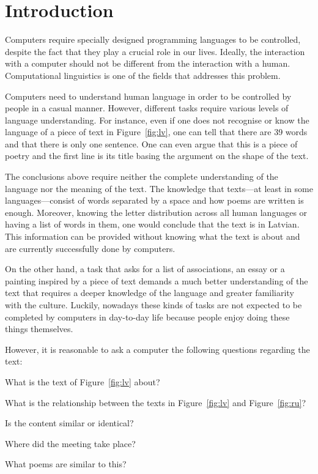 \chapter{Introduction}
\label{ch:introduction}

Computers require specially designed programming languages to be controlled, despite the fact that they play a crucial role in our lives. Ideally, the interaction with a computer should not be different from the interaction with a human. Computational linguistics is one of the fields that addresses this problem.

Computers need to understand human language in order to be controlled by people in a casual manner. However, different tasks require various levels of language understanding. For instance, even if one does not recognise or know the language of a piece of text in Figure~\ref{fig:lv}, one can tell that there are 39 words and that there is only one sentence. One can even argue that this is a piece of poetry and the first line is its title basing the argument on the shape of the text.

The conclusions above require neither the complete understanding of the language nor the meaning of the text. The knowledge that texts---at least in some languages---consist of words separated by a space and how poems are written is enough. Moreover, knowing the letter distribution across all human languages or having a list of words in them, one would conclude that the text is in Latvian. This information can be provided without knowing what the text is about and are currently successfully done by computers.



On the other hand, a task that asks for a list of associations, an essay or a painting inspired by a piece of text demands a much better understanding of the text that requires a deeper knowledge of the language and greater familiarity with the culture. Luckily, nowadays these kinds of tasks are not expected to be completed by computers in day-to-day life because people enjoy doing these things themselves.

However, it is reasonable to ask a computer the following questions regarding the text:
\begin{inparaenum}[a)]
\item What is the text of Figure~\ref{fig:lv} about?
\item What is the relationship between the texts in Figure~\ref{fig:lv} and
  Figure~\ref{fig:ru}?
\item Is the content similar or identical?
\item Where did the meeting take place?
\item What poems are similar to this?
\end{inparaenum}

